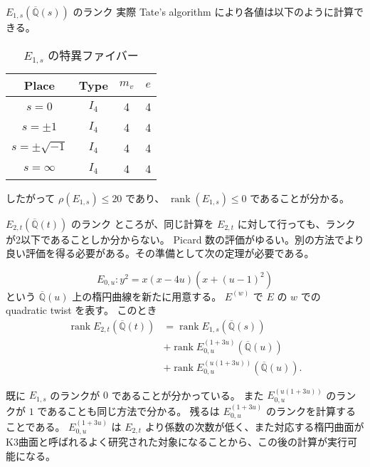 \documentclass{classes/mybeamer}
\DeclareMathOperator{\rank}{rank}
\begin{document}
\begin{frame}{$E_{1,s}(\overline{\mathbb{Q}}(s))$ のランク}
    実際 Tate's algorithm により各値は以下のように計算できる。
    \begin{table}[htbp]
        \centering
        \caption{$E_{1,s}$ の特異ファイバー}
        \begin{tabular}{|c|c|c|c|}
            \hline
            Place             & Type  & $m_v$ & $e$ \\
            \hline
            $s=0$             & $I_4$ & 4     & 4   \\
            $s=\pm 1$         & $I_4$ & 4     & 4   \\
            $s=\pm \sqrt{-1}$ & $I_4$ & 4     & 4   \\
            $s=\infty$        & $I_4$ & 4     & 4   \\
            \hline
        \end{tabular}
    \end{table}
    したがって $\rho(E_{1,s}) \leq 20$ であり、 $\rank(E_{1,s}) \leq 0$ であることが分かる。
    \vspace{1em}
\end{frame}

\begin{frame}{$E_{2,t}(\overline{\mathbb{Q}}(t))$ のランク}
    ところが、同じ計算を $E_{2,t}$ に対して行っても、ランクが2以下であることしか分からない。
    Picard 数の評価がゆるい。別の方法でより良い評価を得る必要がある。その準備として次の定理が必要である。
    \begin{thm}
        \begin{equation*}
            E_{0,u}: y^{2} = x(x - 4u)(x + (u - 1)^{2})
        \end{equation*}
        という $\overline{\mathbb{Q}}(u)$ 上の楕円曲線を新たに用意する。
        $E^{(w)}$ で $E$ の $w$ での quadratic twist を表す。
        このとき
        \begin{equation}
            \label{eq:rankdecomposition}
            \begin{split}
                \rank E_{2,t}(\overline{\mathbb{Q}}(t)) & = \rank E_{1,s}(\overline{\mathbb{Q}}(s))                \\
                                                        & + \rank E_{0,u}^{(1 + 3u)}(\overline{\mathbb{Q}}(u))     \\
                                                        & + \rank E_{0,u}^{(u(1 + 3u))}(\overline{\mathbb{Q}}(u)).
            \end{split}
        \end{equation}
    \end{thm}
    既に $E_{1,s}$ のランクが $0$ であることが分かっている。
    また $E_{0,u}^{(u(1 + 3u))}$ のランクが $1$ であることも同じ方法で分かる。
    残るは $E_{0,u}^{(1 + 3u)}$ のランクを計算することである。
    $E_{0,u}^{(1 + 3u)}$ は $E_{2,t}$ より係数の次数が低く、また対応する楕円曲面がK3曲面と呼ばれるよく研究された対象になることから、この後の計算が実行可能になる。
\end{frame}
\end{document}

